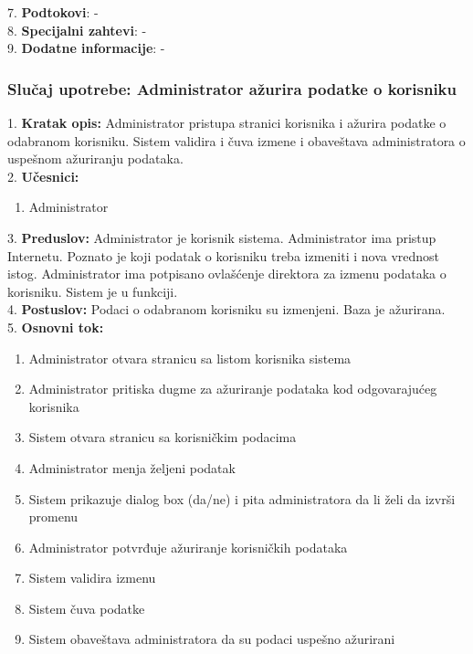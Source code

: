 \documentclass{article}
\begin{document}
7. \textbf{Podtokovi}: - \\

8. \textbf{Specijalni zahtevi}: - \\

9. \textbf{Dodatne informacije}: - \\

\subsubsection{Slučaj upotrebe: Administrator ažurira podatke o korisniku}
1. \textbf{Kratak opis:} Administrator pristupa stranici korisnika i ažurira podatke o odabranom korisniku. Sistem validira i čuva izmene i obaveštava administratora o uspešnom ažuriranju podataka. \\

2. \textbf{Učesnici:}
\begin{enumerate} [label=(\alph*)]
\item Administrator
\end{enumerate} 

3. \textbf{Preduslov:} Administrator je korisnik sistema. Administrator ima pristup Internetu. Poznato je koji podatak o korisniku treba izmeniti i nova vrednost istog. Administrator ima potpisano ovlašćenje direktora za izmenu podataka o korisniku. Sistem je u funkciji. \\

4. \textbf{Postuslov:} Podaci o odabranom korisniku su izmenjeni. Baza je ažurirana. \\

5. \textbf{Osnovni tok:} 
\begin{enumerate} [label=(\alph*)]
\item Administrator otvara stranicu sa listom korisnika sistema
\item Administrator pritiska dugme za ažuriranje podataka kod odgovarajućeg korisnika
\item Sistem otvara stranicu sa korisničkim podacima
\item Administrator menja željeni podatak
\item Sistem prikazuje dialog box (da/ne) i pita administratora da li želi da izvrši promenu
\item Administrator potvrđuje ažuriranje korisničkih podataka
\item Sistem validira izmenu
\item Sistem čuva podatke
\item Sistem obaveštava administratora da su podaci uspešno ažurirani
\end{enumerate}
\end{document}

